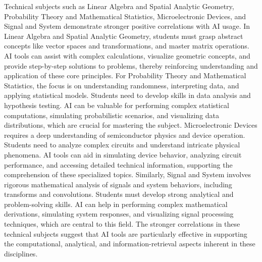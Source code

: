 \documentclass[manuscript,screen,review]{acmart}
\begin{document}
Technical subjects such as Linear Algebra and Spatial Analytic Geometry, Probability Theory and Mathematical Statistics, Microelectronic Devices, and Signal and System demonstrate stronger positive correlations with AI usage.
In Linear Algebra and Spatial Analytic Geometry, students must grasp abstract concepts like vector spaces and transformations, and master matrix operations. AI tools can assist with complex calculations, visualize geometric concepts, and provide step-by-step solutions to problems, thereby reinforcing understanding and application of these core principles.
For Probability Theory and Mathematical Statistics, the focus is on understanding randomness, interpreting data, and applying statistical models. Students need to develop skills in data analysis and hypothesis testing. AI can be valuable for performing complex statistical computations, simulating probabilistic scenarios, and visualizing data distributions, which are crucial for mastering the subject.
Microelectronic Devices requires a deep understanding of semiconductor physics and device operation. Students need to analyze complex circuits and understand intricate physical phenomena. AI tools can aid in simulating device behavior, analyzing circuit performance, and accessing detailed technical information, supporting the comprehension of these specialized topics.
Similarly, Signal and System involves rigorous mathematical analysis of signals and system behaviors, including transforms and convolutions. Students must develop strong analytical and problem-solving skills. AI can help in performing complex mathematical derivations, simulating system responses, and visualizing signal processing techniques, which are central to this field.
The stronger correlations in these technical subjects suggest that AI tools are particularly effective in supporting the computational, analytical, and information-retrieval aspects inherent in these disciplines.
\end{document}
